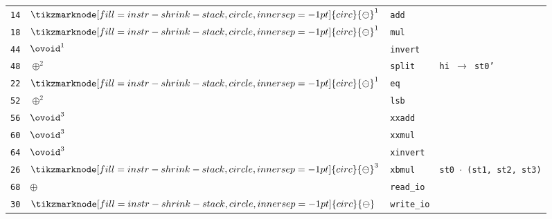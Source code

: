 \documentclass{article}
\newcommand{\shrinkstack}[1]{\tikzmarknode[fill=instr-shrink-stack,circle,inner sep=-1pt]{circ}{#1}}
\newcommand{\hintsplit}{
    \textcolor{hint}{\texttt{hi $\rightarrow$ st0'}}
}
\newcommand{\hintxbmul}{
    \textcolor{hint}{\texttt{st0 $\cdot$ (st1, st2, st3)}}
}
\newcommand{\ssominus}{
    \shrinkstack{\ensuremath{\ominus}}
}
\begin{document}
\begin{minipage}{0.3\textwidth}
\begin{tabular}{rlll}
    \texttt{14} & $\ssominus^1$ & \texttt{add}                                       &                \\
    \texttt{18} & $\ssominus^1$ & \texttt{mul}                                       &                \\
    \texttt{44} & $\ovoid^1$    & \texttt{invert}                                    &                \\
    \texttt{48} & $\oplus^2$    & \texttt{split}                                     & \hintsplit     \\
    \texttt{22} & $\ssominus^1$ & \texttt{eq}                                        &                \\
    \texttt{52} & $\oplus^2$    & \texttt{lsb}                                       &                \\
    \texttt{56} & $\ovoid^3$    & \texttt{xxadd}                                     &                \\
    \texttt{60} & $\ovoid^3$    & \texttt{xxmul}                                     &                \\
    \texttt{64} & $\ovoid^3$    & \texttt{xinvert}                                   &                \\
    \texttt{26} & $\ssominus^3$ & \texttt{xbmul}                                     & \hintxbmul     \\
    \texttt{68} & $\oplus$      & \texttt{read\_io}                                  &                \\
    \texttt{30} & $\ssominus$   & \texttt{write\_io}                                 &
\end{tabular}
\end{minipage}\hfill%
\end{document}
